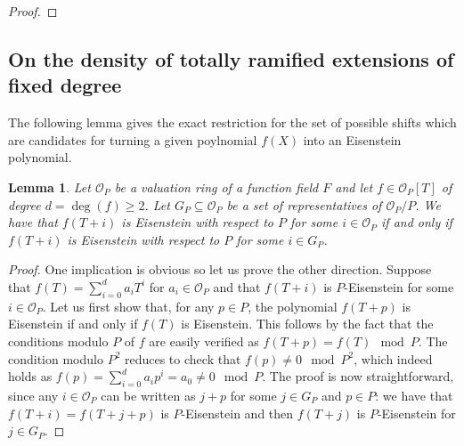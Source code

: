 \documentclass[10pt]{amsart}
\newcommand{\cO}{\mathcal{O}}
\newtheorem{lemma}[theorem]{Lemma}
\theoremstyle{definition}
\theoremstyle{remark}
\numberwithin{equation}{section}
\begin{document}
\begin{proof}


\end{proof}


\subsection{On the density of totally ramified extensions of fixed degree}

The following lemma gives the exact restriction for the set of possible shifts which are candidates for turning a given poylnomial $f(X)$ into an Eisenstein polynomial. 

\begin{lemma}
Let $\cO_P$ be a valuation ring of a function field $F$ and let $f\in \cO_P[T]$ of degree $d=\deg(f)\geq 2$. Let $G_P\subseteq \cO_P$ be a set of representatives of
$\cO_P/P$.  
We have that $f(T+i)$ is Eisenstein with respect to $P$  for some $i\in \cO_P$ if and only if $f(T+i)$ is Eisenstein with respect to $P$ for some $i\in G_P$.
\end{lemma}
\begin{proof}
One implication is obvious so let us prove the other direction.
Suppose that $f(T)=\sum^d_{i=0} a_i T^i$ for $a_i\in \cO_P$ and that $f(T+i)$ is $P$-Eisenstein for some $i\in \cO_P$.
Let us first show that, for any $p\in P$, the polynomial $f(T+p)$ is Eisenstein if and only if $f(T)$ is Eisenstein. This follows by the fact that the conditions modulo $P$ of $f$ are easily verified
as $f(T+p)=f(T) \mod P$. The condition modulo $P^2$ reduces to check that $f(p)\neq 0 \mod P^2$, which indeed holds as $f(p)=\sum^d_{i=0} a_i p^i=a_0\neq 0\mod P$.
The proof is now straightforward, since any $i\in \cO_P$ can be written as $j+p$ for some $j\in G_P$ and $p\in P$: we have that  $f(T+i)=f(T+j+p)$ is $P$-Eisenstein and then $f(T+j)$ is $P$-Eisenstein for $j\in G_P$.
\end{proof}
\end{document}
